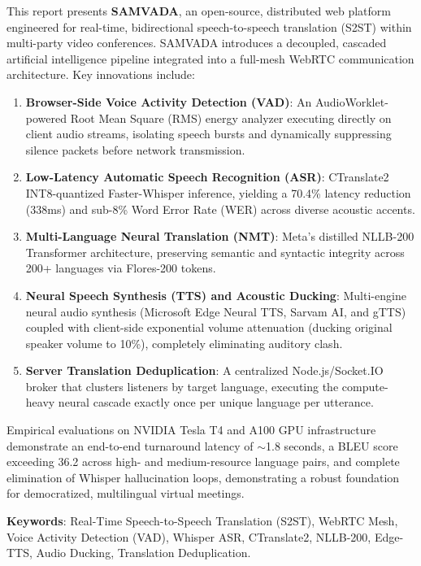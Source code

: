 \documentclass[12pt,a4paper]{report}
\begin{document}
\noindent This report presents \textbf{SAMVADA}, an open-source, distributed web platform engineered for real-time, bidirectional speech-to-speech translation (S2ST) within multi-party video conferences. SAMVADA introduces a decoupled, cascaded artificial intelligence pipeline integrated into a full-mesh WebRTC communication architecture. Key innovations include:
\begin{enumerate}
    \item \textbf{Browser-Side Voice Activity Detection (VAD)}: An AudioWorklet-powered Root Mean Square (RMS) energy analyzer executing directly on client audio streams, isolating speech bursts and dynamically suppressing silence packets before network transmission.
    \item \textbf{Low-Latency Automatic Speech Recognition (ASR)}: CTranslate2 INT8-quantized Faster-Whisper inference, yielding a 70.4\% latency reduction (338ms) and sub-8\% Word Error Rate (WER) across diverse acoustic accents.
    \item \textbf{Multi-Language Neural Translation (NMT)}: Meta's distilled NLLB-200 Transformer architecture, preserving semantic and syntactic integrity across 200+ languages via Flores-200 tokens.
    \item \textbf{Neural Speech Synthesis (TTS) and Acoustic Ducking}: Multi-engine neural audio synthesis (Microsoft Edge Neural TTS, Sarvam AI, and gTTS) coupled with client-side exponential volume attenuation (ducking original speaker volume to 10\%), completely eliminating auditory clash.
    \item \textbf{Server Translation Deduplication}: A centralized Node.js/Socket.IO broker that clusters listeners by target language, executing the compute-heavy neural cascade exactly once per unique language per utterance.
\end{enumerate}

\noindent Empirical evaluations on NVIDIA Tesla T4 and A100 GPU infrastructure demonstrate an end-to-end turnaround latency of $\sim$1.8 seconds, a BLEU score exceeding 36.2 across high- and medium-resource language pairs, and complete elimination of Whisper hallucination loops, demonstrating a robust foundation for democratized, multilingual virtual meetings.

\vspace{0.5cm}
\noindent \textbf{Keywords}: Real-Time Speech-to-Speech Translation (S2ST), WebRTC Mesh, Voice Activity Detection (VAD), Whisper ASR, CTranslate2, NLLB-200, Edge-TTS, Audio Ducking, Translation Deduplication.
\end{document}
